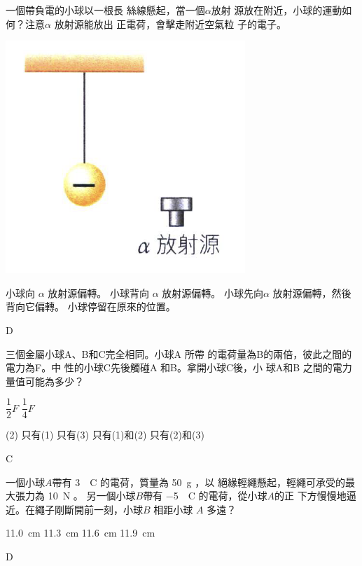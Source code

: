 {
    一個帶負電的小球以一根長 絲線懸起，當一個$\alpha$放射 源放在附近，小球的運動如 何？注意$\alpha$ 放射源能放出 正電荷，會擊走附近空氣粒 子的電子。
    \par{\par\centering\includegraphics[width=.25\textwidth]{./img/ch1_electrostatics_lq_2024-06-18-17-03-33.png}\par}
    \begin{tasks}
        \task 小球向 $\alpha$ 放射源偏轉。
        \task 小球背向 $\alpha$ 放射源偏轉。
        \task 小球先向$\alpha$ 放射源偏轉，然後背向它偏轉。
        \task 小球停留在原來的位置。
    \end{tasks}
}{D}

{
    三個金屬小球A、B和C完全相同。小球A 所帶 的電荷量為B的兩倍，彼此之間的電力為F。中 性的小球C先後觸碰A 和B。拿開小球C後，小 球A和B 之間的電力量值可能為多少？
    \begin{statements}
        \task $\dfrac{1}{2}F$
        \task $\dfrac{1}{4}F$
    \end{statements}
    \begin{tasks}(2)
        \task 只有(1)
        \task 只有(3)
        \task 只有(1)和(2)
        \task 只有(2)和(3)
    \end{tasks}
}{C}

{
    一個小球$A$帶有  \qty{3}{\mu C} 的電荷，質量為  \qty{50}{g} ，以 絕緣輕繩懸起，輕繩可承受的最大張力為  \qty{10}{N} 。 另一個小球$B$帶有  \qty{-5}{\mu C} 的電荷，從小球$A$的正 下方慢慢地逼近。在繩子剛斷開前一刻，小球$B$ 相距小球 $A$ 多遠？
    \begin{tasks}
        \task  \qty{11.0}{cm}
        \task  \qty{11.3}{cm}
        \task  \qty{11.6}{cm}
        \task  \qty{11.9}{cm}
    \end{tasks}
}{D}

